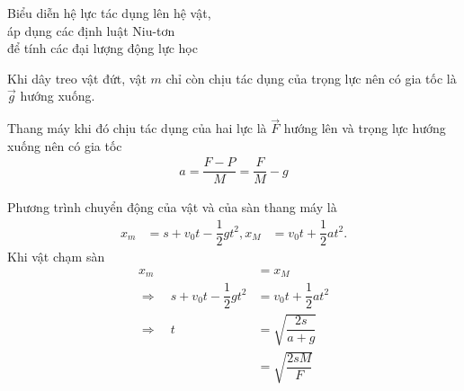 \begin{dang}{Biểu diễn hệ lực tác dụng lên hệ vật, \\áp dụng các định luật Niu-tơn \\để tính các đại lượng động lực học}
{\begin{enumerate}[label=\alph*.]
			Khi dây treo vật đứt, vật $m$ chỉ còn chịu tác dụng của trọng lực nên có gia tốc là $\vec{g}$ hướng xuống. 
			
			Thang máy khi đó chịu tác dụng của hai lực là $\vec{F}$ hướng lên và trọng lực hướng xuống nên có gia tốc 
				\begin{align*}
					a=\dfrac{F-P}{M}=\dfrac{F}{M}-g
				\end{align*}		
			
			Phương trình chuyển động của vật và của sàn thang máy là 
				\begin{align*}
					x_m&=s+v_0t-\dfrac{1}{2}gt^2,
					x_M&=v_0t+\dfrac{1}{2}at^{2}.
				\end{align*}
			Khi vật chạm sàn
				\begin{align*}
					x_m&=x_M\\
					\Rightarrow\quad s+v_0t-\dfrac{1}{2}gt^2&=v_0t+\dfrac{1}{2}at^{2}\\
					\Rightarrow\quad t&=\sqrt{\dfrac{2s}{a+g}}\\
					&=\sqrt{\dfrac{2sM}{F}}
				\end{align*}
			
			
			
			
			
			
			
		
			
		\end{enumerate}	
	}
	
\end{dang}
